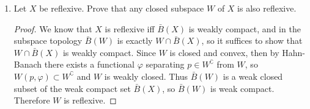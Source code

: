 \documentclass[12pt,letterpaper]{article}
\renewcommand{\phi}{\varphi}
\begin{document}
\begin{enumerate}
\pagebreak
\renewcommand{\phi}{\varphi}
\setcounter{enumi}{4}
\item Let $X$ be reflexive. Prove that any closed subspace $W$ of $X$ is also reflexive. 

\renewcommand{\B}{\bar{B}}
\begin{proof}
We know that $X$ is reflexive iff $\B(X)$ is weakly compact, and in the subspace topology $\B(W)$ is exactly $W\cap \B(X)$, so it suffices to show that $W\cap \B(X)$ is weakly compact. %
Since $W$ is closed and convex, then by Hahn-Banach there exists a functional $\phi$ separating $p\in W^\complement$ from $W$, so $W(p,\phi)\subset W^\complement$ and $W$ is weakly closed. Thus $\B(W)$ is a weak closed subset of the weak compact set $\B(X)$, so $\B(W)$ is weak compact. Therefore $W$ is reflexive. 
\end{proof}


\end{enumerate}
\end{document}
